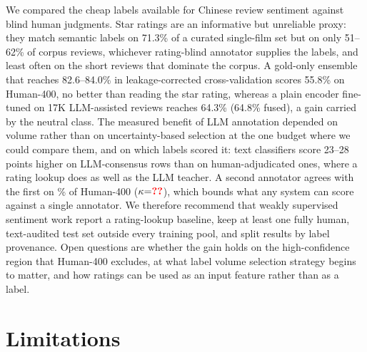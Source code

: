 \documentclass[11pt]{article}
\begin{document}
We compared the cheap labels available for Chinese review sentiment
against blind human judgments. Star ratings are an informative but
unreliable proxy: they match semantic labels on 71.3\% of a curated
single-film set but on only 51--62\% of corpus reviews, whichever
rating-blind annotator supplies the labels, and least often on the
short reviews that dominate the corpus. A gold-only ensemble that
reaches 82.6--84.0\% in leakage-corrected cross-validation scores
55.8\% on Human-400, no better than reading the star rating, whereas
a plain encoder fine-tuned on 17K LLM-assisted reviews reaches
64.3\% (64.8\% fused), a gain carried by the neutral class. The
measured benefit of LLM annotation depended on volume rather than on
uncertainty-based selection at the one budget where we could compare
them, and on which labels scored it: text classifiers score
23--28 points higher on LLM-consensus rows than on human-adjudicated
ones, where a rating lookup does as well as the LLM teacher.
\ifSfive A second annotator agrees with the first on \IAAraw\% of
Human-400 ($\kappa{=}\IAAkappa$), which bounds what any system can
score against a single annotator. \fi
We therefore recommend that weakly supervised sentiment work report a
rating-lookup baseline, keep at least one fully human, text-audited
test set outside every training pool, and split results by label
provenance. Open questions are whether the gain holds on the
high-confidence region that Human-400 excludes, at what label volume
selection strategy begins to matter, and how ratings can be used as
an input feature rather than as a label.

\section*{Limitations}
\label{sec:limitations}
\end{document}
